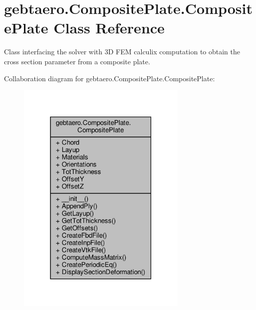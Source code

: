 \hypertarget{classgebtaero_1_1_composite_plate_1_1_composite_plate}{}\section{gebtaero.\+Composite\+Plate.\+Composite\+Plate Class Reference}
\label{classgebtaero_1_1_composite_plate_1_1_composite_plate}


Class interfacing the solver with 3D F\+EM calculix computation to obtain the cross section parameter from a composite plate.  




Collaboration diagram for gebtaero.\+Composite\+Plate.\+Composite\+Plate\+:
\nopagebreak
\begin{figure}[H]
\begin{center}
\leavevmode
\includegraphics[width=231pt]{classgebtaero_1_1_composite_plate_1_1_composite_plate__coll__graph}
\end{center}
\end{figure}
